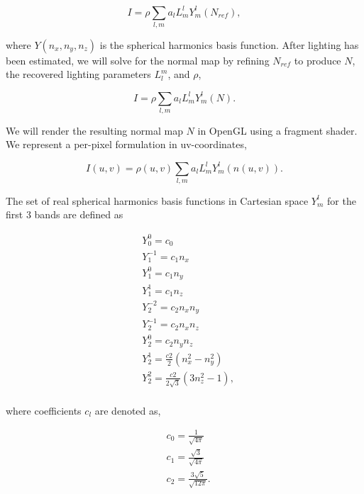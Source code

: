 \documentclass[10pt,twocolumn,letterpaper]{article}
\begin{document}
\begin{equation}
I = \rho \sum_{l,m} a_l L_m^l Y_m^l(N_{ref}),
\end{equation}

where $Y(n_x,n_y,n_z)$ is the spherical harmonics basis function. After lighting has been estimated, we will solve for the normal map by refining $N_{ref}$ to produce $N$, the recovered lighting parameters $L_l^m$, and $\rho$,

\begin{equation}
I = \rho \sum_{l,m} a_l L_m^l Y_m^l(N).
\end{equation}

We will render the resulting normal map $N$ in OpenGL using a fragment shader. We represent a per-pixel formulation in uv-coordinates,

\begin{equation}
I(u,v) = \rho(u,v) \sum_{l,m} a_l L_m^l Y_m^l(n(u,v)).
\end{equation}

The set of real spherical harmonics basis functions in Cartesian space $Y_m^l$ for the first 3 bands are defined \cite{sfs} as 

\begin{equation}
\begin{split}
&Y_0^0 = c_0\\
&Y_1^{-1} = c_1 n_x\\
&Y_1^{0} = c_1 n_y\\
&Y_1^{1} = c_1 n_z\\
&Y_2^{-2} = c_2 n_x n_y\\
&Y_2^{-1} = c_2 n_x n_z\\
&Y_2^{0} = c_2 n_y n_z\\
&Y_2^{1} = \frac{c2}{2}(n_x^2 - n_y^2)\\
&Y_2^{2} = \frac{c2}{2\sqrt{3}}(3n_z^2 - 1),\\
\end{split}
\end{equation}

where coefficients $c_l$ are denoted as,

\begin{equation}
\begin{split}
&c_0 = \frac{1}{\sqrt{4\pi}}\\
&c_1 = \frac{\sqrt{3}}{\sqrt{4\pi}}\\
&c_2 = \frac{3\sqrt{5}}{\sqrt{12\pi}}.\\
\end{split}
\end{equation}
\end{document}
